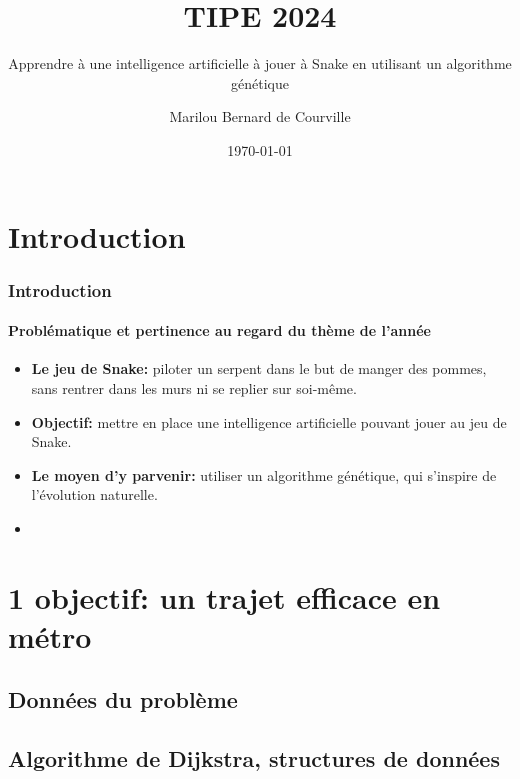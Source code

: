 \documentclass[10pt]{beamer}
\title{TIPE 2024}
\subtitle{Apprendre à une intelligence artificielle à jouer à Snake en utilisant un algorithme génétique}
\author{Marilou Bernard de Courville}
\institute{Lycée Charlemagne}
\date{\today}
\begin{document}
 
\begin{frame}
    \titlepage
\end{frame}


\section{Introduction}

\begin{frame}
\frametitle{Introduction}
\framesubtitle{Problématique et pertinence au regard du thème de l'année}

\begin{itemize}

\item \textbf{Le jeu de Snake:} piloter un serpent dans le but de
manger des pommes, sans rentrer dans les murs ni se replier sur 
soi-même.

\item \textbf{Objectif:} mettre en place une intelligence
artificielle pouvant jouer au jeu de Snake.

\item \textbf{Le moyen d'y parvenir:} utiliser un algorithme génétique,
qui s'inspire de l'évolution naturelle.

\item 

\end{itemize}

\end{frame}

\section{\textbf{1\ier{} objectif}: un trajet efficace en métro}

\subsection{Données du problème}

\subsection{Algorithme de Dijkstra, structures de données}
\end{document}

